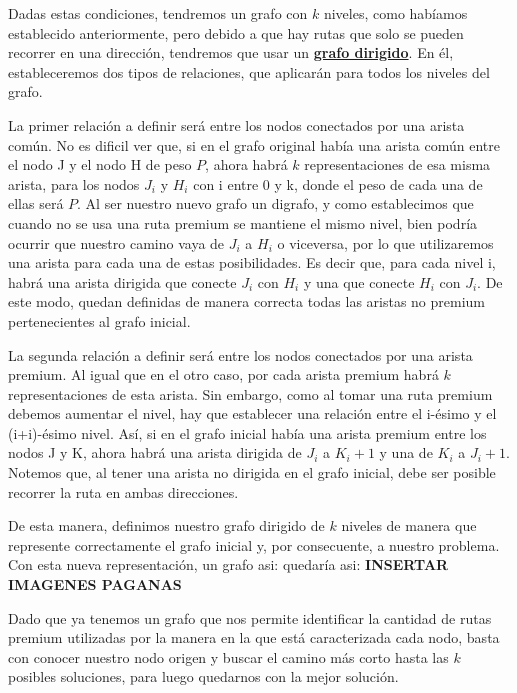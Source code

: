 Dadas estas condiciones, tendremos un grafo con $k$ niveles, como habíamos establecido anteriormente, pero debido a que hay rutas que solo se pueden recorrer en una dirección, tendremos que usar un \underline{\textbf{grafo dirigido}}. En él, estableceremos dos tipos de relaciones, que aplicarán para todos los niveles del grafo.
\\
\par
La primer relación a definir será entre los nodos conectados por una arista común. No es dificil ver que, si en el grafo original había una arista común entre el nodo J y el nodo H de peso $P$, ahora habrá $k$ representaciones de esa misma arista, para los nodos $J_i$ y $H_i$ con i entre 0 y k, donde el peso de cada una de ellas será $P$. Al ser nuestro nuevo grafo un digrafo, y como establecimos que cuando no se usa una ruta premium se mantiene el mismo nivel, bien podría ocurrir que nuestro camino vaya de $J_i$ a $H_i$ o viceversa, por lo que utilizaremos una arista para cada una de estas posibilidades. Es decir que, para cada nivel i, habrá una arista dirigida que conecte $J_i$ con $H_i$ y una que conecte $H_i$ con $J_i$. De este modo, quedan definidas de manera correcta todas las aristas no premium pertenecientes al grafo inicial.
\\
\par
La segunda relación a definir será entre los nodos conectados por una arista premium. Al igual que en el otro caso, por cada arista premium habrá $k$ representaciones de esta arista. Sin embargo, como al tomar una ruta premium debemos aumentar el nivel, hay que establecer una relación entre el i-ésimo y el (i+i)-ésimo nivel. Así, si en el grafo inicial había una arista premium entre los nodos J y K, ahora habrá una arista dirigida de $J_i$ a $K_i+1$ y una de $K_i$ a $J_i+1$. Notemos que, al tener una arista no dirigida en el grafo inicial, debe ser posible recorrer la ruta en ambas direcciones.
\\
\par
De esta manera, definimos nuestro grafo dirigido de $k$ niveles de manera que represente correctamente el grafo inicial y, por consecuente, a nuestro problema. Con esta nueva representación, un grafo asi: quedaría asi: \textbf{INSERTAR IMAGENES PAGANAS}
\\
\par
Dado que ya tenemos un grafo que nos permite identificar la cantidad de rutas premium utilizadas por la manera en la que está caracterizada cada nodo, basta con conocer nuestro nodo origen y buscar el camino más corto hasta las $k$ posibles soluciones, para luego quedarnos con la mejor solución.

